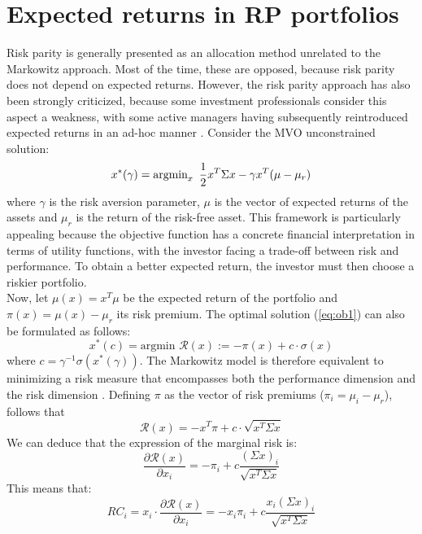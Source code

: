\section{Expected returns in RP portfolios}
Risk parity is generally presented as an allocation method unrelated to the Markowitz approach. Most of the time, these are opposed, because risk parity does not depend on expected returns. However, the risk parity approach has also been strongly criticized, because some investment professionals consider this aspect a weakness, with some active managers having subsequently reintroduced expected returns in an ad-hoc manner \cite{intr}. Consider the MVO unconstrained solution:
\begin{equation}\label{eq:ob1}
x^*(\gamma) = \mbox{argmin}_x \enskip \frac{1}{2} x^T \Sigma x - \gamma x^T (\mu - \mu_r)
\end{equation}
where $\gamma$ is the risk aversion parameter, $\mu$ is the vector of expected returns of the assets and $\mu_r$ is the return of the risk-free asset. This framework is particularly appealing because the objective function has a concrete financial interpretation in terms of utility functions, with the investor facing a trade-off between risk and performance. To obtain a better expected return, the investor must then choose a riskier portfolio.\\
Now, let $\mu(x) = x^T \mu$ be the expected return of the portfolio and $\pi(x) = \mu(x) - \mu_r$ its risk premium. The optimal solution (\ref{eq:ob1}) can also be formulated as follows:
\begin{equation}
x^*(c) =\mbox{argmin } \mathcal{R}(x) := - \pi(x) + c \cdot \sigma(x)
\end{equation}
where $c = \gamma^{-1} \sigma(x^*(\gamma))$. The Markowitz model is therefore equivalent to minimizing a risk measure that
encompasses both the performance dimension and the risk dimension \cite{intr}. Defining $\pi$ as the vector of risk premiums ($\pi_i = \mu_i - \mu_r$), follows that
\begin{equation}\label{eq:risk2}
\mathcal{R}(x) = -x^T \pi + c \cdot \sqrt{x^T \Sigma x}
\end{equation}
We can deduce that the expression of the marginal risk is:
\begin{equation}
\frac{\partial \mathcal{R}(x)}{\partial x_i} = -\pi_i + c \frac{(\Sigma x)_i}{\sqrt{x^T \Sigma x}}
\end{equation}
This means that:
\begin{equation}
RC_i = x_i \cdot \frac{\partial \mathcal{R}(x)}{\partial x_i} = -x_i\pi_i + c \frac{x_i(\Sigma x)_i}{\sqrt{x^T \Sigma x}}
\end{equation}

